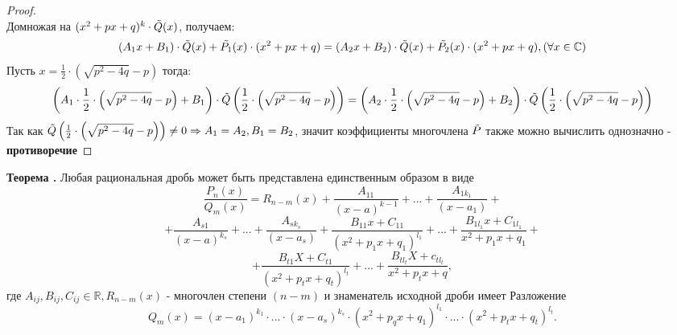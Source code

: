 \documentclass{article}
\newcommand*{\theorem}[2]{\textbf{Теорема #1. } #2 \newline}
\newcommand*{\R}{\mathbb{R}}
\newcommand*{\p}[1][n]{P_{#1}(x)}
\newcommand*{\Q}[1][m]{Q_{#1}(x)}
\newcommand*{\Rfrac}[2]{\frac{\p{#1}}{\Q{#2}}}
\begin{document}
\begin{proof}
$$    $$ 
    Домножая на $(x^2 + px + q)^k \cdot \Tilde{Q}(x)$, получаем:
    $$
        (A_1x+B_1) \cdot \Tilde{Q}(x) + \Tilde{P_1}(x) \cdot (x^2 + px + q) = (A_2x + B_2) \cdot \Tilde{Q}(x) + \Tilde{P_2}(x) \cdot (x^2 + px + q), (\forall x \in \mathbb{C})
    $$
    Пусть $x = \frac{1}{2} \cdot \left(\sqrt{p^2 - 4q} - p\right)$ тогда: 
    $$
        \left(A_1 \cdot \frac{1}{2} \cdot \left(\sqrt{p^2 - 4q} - p\right)+B_1\right) \cdot \Tilde{Q}\left(\frac{1}{2} \cdot \left(\sqrt{p^2 - 4q} - p\right)\right) = \left(A_2 \cdot \frac{1}{2} \cdot \left(\sqrt{p^2 - 4q} - p\right) + B_2 \right) \cdot \Tilde{Q}\left(\frac{1}{2} \cdot \left(\sqrt{p^2 - 4q} - p\right)\right)
    $$
    Так как $\Tilde{Q}\left(\frac{1}{2} \cdot \left(\sqrt{p^2 - 4q} - p\right)\right) \neq 0 \Rightarrow A_1 = A_2, B_1 = B_2$, значит коэффициенты многочлена $\Tilde{P}$ также можно вычислить однозначно - \textbf{противоречие}
\end{proof}
\theorem{}{Любая рациональная дробь может быть представлена единственным образом в виде
    $$
        \Rfrac{}{} = R_{n - m}(x) + \frac{A_{11}}{(x - a)^{k-1}} + ... + \frac{A_{1k_1}}{(x - a_1)} +
    $$
    $$
        + \frac{A_{s1}}{(x - a)^{k_s}} + ... + \frac{A_{sk_s}}{(x - a_s)} + \frac{B_{11}x + C_{11}}{(x^2 + p_1x + q_1)^{l_1}} + ... + \frac{B_{1l_1}x + C_{1l_1}}{x^2 + p_1x + q_1} +
    $$
    $$
    + \frac{B_{t1}X + C_{t1}}{(x^2 + p_tx + q_t)^{l_t}} + ... + \frac{B_{tl_t}X + c_{tl_t}}{x^2 + p_tx + q},
    $$
    где $A_{ij}, B_{ij}, C_{ij} \in \R, R_{n-m}(x)$ - многочлен степени $(n - m)$ и знаменатель исходной дроби имеет Разложение
    $$
        \Q = (x - a_1)^{k_1} \cdot ... \cdot (x - a_s)^{k_s} \cdot (x^2 + p_qx + q_1)^{l_1} \cdot ... \cdot (x^2 + p_tx + q_t)^{l_t}.
    $$
}
\end{document}
